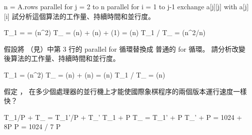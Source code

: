 \startCLRS
n = A.rows
parallel for j = 2 to n
	parallel for i = 1 to j-1
		exchange a[j][j] with a[j][i]
\stopCLRS
試分析這個算法的工作量、持續時間和並行度。
\stopEXERCISE

\startANSWER
\startformula\startmathalignment
\NC T_1 \NC =  = \Theta(n^2) \NR
\NC T_{\infty} \NC = \Theta(\lg n) + \Theta(\lg n) + \Theta(1) = \Theta(\lg n) \NR
\NC T_1 / T_{\infty} \NC = \Theta(n^2/\lg n) \NR
\stopmathalignment\stopformula
\stopANSWER

\startEXERCISE
假設將  （見\inexercise[27.1-7]）中第 3 行的 {\EMP parallel for} 循環替換成
普通的 {\EMP for} 循環。
請分析改變後算法的工作量、持續時間和並行度。
\stopEXERCISE

\startANSWER
\startformula\startmathalignment
\NC T_1 \NC = \Theta(n^2) \NR
\NC T_{\infty} \NC = \Theta(\lg n) + \Theta(n) = \Theta(n) \NR
\NC T_1 / T_{\infty} \NC = \Theta(n) \NR
\stopmathalignment\stopformula
\stopANSWER

\startEXERCISE
假定 ，
在多少個處理器的並行機上才能使國際象棋程序的兩個版本運行速度一樣快？
\stopEXERCISE

\startANSWER
\startformula\startmathalignment
\NC T_1/P + T_{\infty} \NC = T_{1}'/P + T_{\infty}' \NR
\NC T_1 + P T_{\infty} \NC = T_{1}' + P T_{\infty}' \NR
{} + P \NC = 1024 + 8P \NR
\NC P \NC = 1024 / 7 \NR
\NC P \NC {} \NR
\stopmathalignment\stopformula
\stopANSWER

\stopsection
